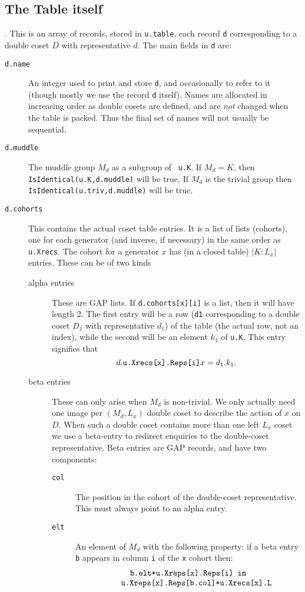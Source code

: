 \subsection{The Table itself}.
This is an array of records, stored in {\tt u.table},
each record {\tt d} corresponding to a double coset $D$ with
representative $d$. The main fields in {\tt d} are:
\begin{description}
\item[\tt d.name] An integer used to print and store {\tt d}, and
occasionally to refer to it (though mostly we use the record {\tt d}
itself). Names are allocated in increasing order as double cosets are
defined, and are {\em not} changed when the table is packed. Thus the
final set of names will not usually be sequential. 
\item[\tt d.muddle] The muddle group $M_d$ as a subgroup of {\tt
u.K}. If $M_d = K$, then {\tt IsIdentical(u.K,d.muddle)} will be
true. If $M_d$ is the trivial group then {\tt
IsIdentical(u.triv,d.muddle)} will be true.
\item[\tt d.cohorts] This contains the actual coset table entries. It
is a list of lists (cohorts), one for each generator (and inverse, if
necessary) in the same order as {\tt u.Xrecs}. The cohort for a
generator $x$ has (in a closed table) $|K:L_x|$ entries. These can be
of two kinds
\begin{description}
\item[alpha entries] These are GAP lists. If {\tt d.cohorts[x][i]} is
a list, then it will have length 2. The first entry will be a row
({\tt d1} corresponding to a double coset $D_1$ with representative
$d_1$) of the table (the actual row, not an index), while the second
will be an element $k_1$ of {\tt u.K}. This entry signifies that
$$d.\mathord{\hbox{\tt u.Xrecs[x].Reps[i]}}x = d_1.k_1.$$
\item[beta entries] These can only arise when $M_d$ is non-trivial. We
only actually need one image per $(M_d,L_x)$ double coset to describe
the action of $x$ on $D$. When such a double coset contains more than
one left $L_x$ coset we use a beta-entry to redirect enquiries to the
double-coset representative.
Beta entries are GAP records, and have two components:
\begin{description}
\item[\tt col] The position in the cohort of the double-coset
representative. This must always point to an alpha entry.
\item[\tt elt] An element of $M_d$ with the following property:
if a beta entry {\tt b} appears in column {\tt i} of the {\tt x} cohort then:
$$\begin{array}{c}\hbox{\tt b.elt*u.Xreps[x].Reps[i] in} \\
\qquad \hbox{\tt u.Xreps[x].Reps[b.col]*u.Xrecs[x].L}\end{array}$$
\end{description}
\end{description}
\end{description}

